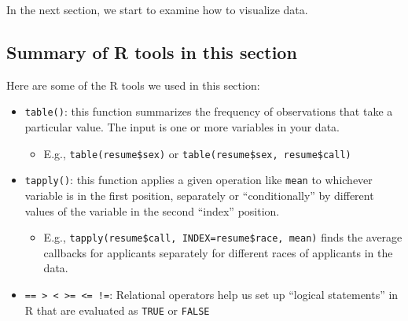 \documentclass[
  letterpaper,
  DIV=11,
  numbers=noendperiod]{scrreprt}
\providecommand{\tightlist}{%
  \setlength{\itemsep}{0pt}\setlength{\parskip}{0pt}}\usepackage{longtable,booktabs,array}
\begin{document}
In the next section, we start to examine how to visualize data.

\hypertarget{summary-of-r-tools-in-this-section}{%
\subsection{Summary of R tools in this
section}\label{summary-of-r-tools-in-this-section}}

Here are some of the R tools we used in this section:

\begin{itemize}
\tightlist
\item
  \texttt{table()}: this function summarizes the frequency of
  observations that take a particular value. The input is one or more
  variables in your data.

  \begin{itemize}
  \tightlist
  \item
    E.g., \texttt{table(resume\$sex)} or
    \texttt{table(resume\$sex,\ resume\$call)}
  \end{itemize}
\item
  \texttt{tapply()}: this function applies a given operation like
  \texttt{mean} to whichever variable is in the first position,
  separately or ``conditionally'' by different values of the variable in
  the second ``index'' position.

  \begin{itemize}
  \tightlist
  \item
    E.g., \texttt{tapply(resume\$call,\ INDEX=resume\$race,\ mean)}
    finds the average callbacks for applicants separately for different
    races of applicants in the data.
  \end{itemize}
\item
  \texttt{==\ \textgreater{}\ \textless{}\ \textgreater{}=\ \textless{}=\ !=}:
  Relational operators help us set up ``logical statements'' in R that
  are evaluated as \texttt{TRUE} or \texttt{FALSE}


\end{itemize}
\end{document}
